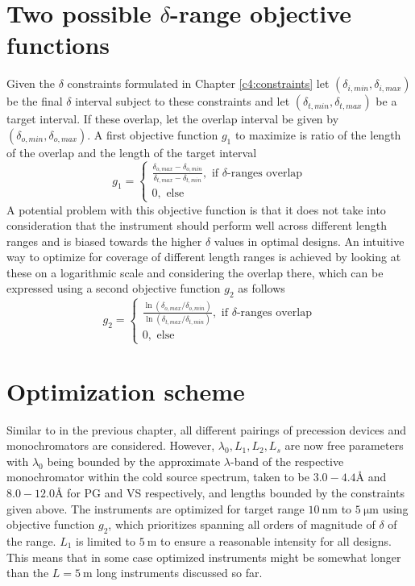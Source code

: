 \section{Two possible $\delta$-range objective functions}
\label{c5.2}
Given the $\delta$ constraints formulated in Chapter \ref{c4:constraints} let $(\delta_{i, min},\delta_{i, max})$ be the final $\delta$ interval subject to these constraints and let $(\delta_{t, min},\delta_{t, max})$ be a target interval. If these overlap, let the overlap interval be given by $(\delta_{o, min},\delta_{o, max})$. A first objective function $g_1$ to maximize is ratio of the length of the overlap and the length of the target interval
$$g_1 = \begin{cases}
	\frac{\delta_{o, max}-\delta_{o, min}}{\delta_{t, max} - \delta_{t, min}},\text{ if $\delta$-ranges overlap}\\
	0,\text{ else}
\end{cases}$$
A potential problem with this objective function is that it does not take into consideration that the instrument should perform well across different length ranges and is biased towards the higher $\delta$ values in optimal designs. An intuitive way to optimize for coverage of different length ranges is achieved by looking at these on a logarithmic scale and considering the overlap there, which can be expressed using a second objective function $g_2$ as follows 
$$g_2 = \begin{cases}
	\frac{\ln(\delta_{o, max}/\delta_{o, min})}{\ln(\delta_{t, max}/\delta_{t, min})},\text{ if $\delta$-ranges overlap}\\
	0,\text{ else}
\end{cases}$$

\section{Optimization scheme}
\label{c5.3}
Similar to in the previous chapter, all different pairings of precession devices and monochromators are considered. However, $\lambda_0, L_1, L_2, L_s$ are now free parameters with $\lambda_0$ being bounded by the approximate $\lambda$-band of the respective monochromator within the cold source spectrum, taken to be $3.0 - 4.4$Å and $8.0 - 12.0$Å for PG and VS respectively, and lengths bounded by the constraints given above. 
The instruments are optimized for target range $\SI{10}{\nano\meter}$ to $\SI{5}{\micro\meter}$ using objective function $g_2$, which prioritizes spanning all orders of magnitude of $\delta$ of the range. $L_1$ is limited to $\SI{5}{\meter}$ to ensure a reasonable intensity for all designs. This means that in some case optimized instruments might be somewhat longer than the $L = \SI{5}{\meter}$ long instruments discussed so far. 


